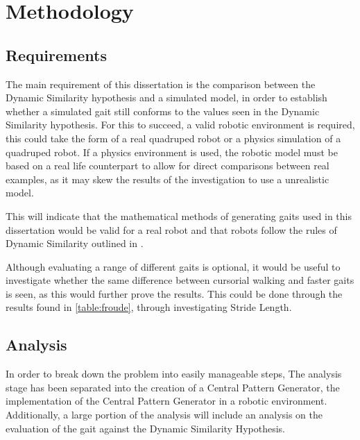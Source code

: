 \chapter{Methodology}


\section{Requirements}

The main requirement of this dissertation is the comparison between the Dynamic Similarity hypothesis and a simulated model, in order to establish whether a simulated gait still conforms to the values seen in the Dynamic Similarity hypothesis. For this to succeed, a valid robotic environment is required, this could take the form of a real quadruped robot or a physics simulation of a quadruped robot. If a physics environment is used, the robotic model must be based on a real life counterpart to allow for direct comparisons between real examples, as it may skew the results of the investigation to use a unrealistic model. 

This will indicate that the mathematical methods of generating gaits used in this dissertation would be valid for a real robot and that robots follow the rules of Dynamic Similarity outlined in \cite{Alexander1983}.

Although evaluating a range of different gaits is optional, it would be useful to investigate whether the same difference between cursorial walking and faster gaits is seen, as this would further prove the results. This could be done through the results found in \ref{table:froude}, through investigating Stride Length.

 

\section{Analysis}
In order to break down the problem into easily manageable steps, The analysis stage has been separated into the creation of a Central Pattern Generator, the implementation of the Central Pattern Generator in a robotic environment. Additionally, a large portion of the analysis will include an analysis on the  evaluation of the gait against the Dynamic Similarity Hypothesis.

